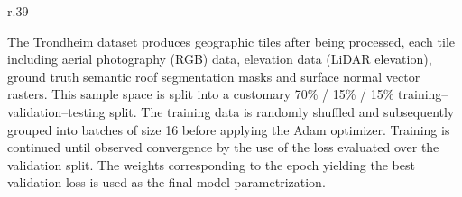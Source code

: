 \begin{wrapfigure}[9]{r}{.39\textwidth}
\end{wrapfigure}

The Trondheim dataset produces \numtiles geographic tiles after being processed, each tile including aerial photography (RGB) data, elevation data (LiDAR elevation), ground truth semantic roof segmentation masks and surface normal vector rasters.
This sample space is split into a customary 70\% / 15\% / 15\% training--validation--testing split.
The training data is randomly shuffled and subsequently grouped into batches of size 16 before applying the Adam optimizer.
Training is continued until observed convergence by the use of the loss evaluated over the validation split.
The weights corresponding to the epoch yielding the best validation loss is used as the final model parametrization.
